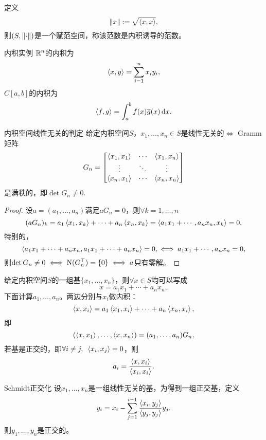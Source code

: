 定义
\begin{equation}
    \left\lVert x\right\rVert:=\sqrt{\left\langle x,x\right\rangle},
\end{equation}
则$(S,\left\lVert\cdot\right\rVert)$是一个赋范空间，称该范数是内积诱导的范数。

\begin{example}
    {内积实例}{}
    $\mathbb R^n$的内积为
    \[
        \left\langle x,y\right\rangle=\sum_{i=1}^nx_iy_i,
    \]
    $C[a,b]$的内积为 
    \[
        \left\langle f,g\right\rangle=\int_a^bf(x)\overline g(x)\mathop{}\!\mathrm{d} x.
    \]
\end{example}

\begin{theorem}
    {内积空间线性无关的判定}{}
    给定内积空间$S$，$x_1,\ldots,x_n\in S$是线性无关的$\iff$ Gramm矩阵
    \begin{equation}
        G_n=\begin{bmatrix}
            \left\langle x_1,x_1\right\rangle&\cdots&\left\langle x_1,x_n\right\rangle\\
            \vdots&\ddots&\vdots\\
            \left\langle x_n,x_1\right\rangle&\cdots&\left\langle x_n,x_n\right\rangle
        \end{bmatrix}
    \end{equation}
    是满秩的，即$\det G_n\neq 0.$
\end{theorem}

\begin{proof}
    设$a=(a_1,\ldots,a_n)$满足$aG_n=0$，则$\forall k=1,\ldots,n$
    \[
        (aG_n)_k=a_1\left\langle x_1,x_k\right\rangle+\cdots+a_n\left\langle x_n,x_k\right\rangle=\left\langle a_1x_1+\cdots,a_nx_n,x_k\right\rangle=0,
    \]
    特别的，
    \[
        \left\langle a_1x_1+\cdots+a_nx_n,a_1x_1+\cdots+a_nx_n\right\rangle=0,\iff a_1x_1+\cdots,a_nx_n=0,
    \]
    则$\det G_n\neq 0\iff \mathrm N(G_n^\top)=\{0\}\iff a$只有零解。
\end{proof}

\begin{example}
    {}{}
    给定内积空间$S$的一组基$\{x_1,\ldots,x_n\}$，则$\forall x\in S$均可以写成
    \[
        x=a_1x_1+\cdots+a_nx_n,
    \]
    下面计算$a_1,\ldots,a_n$。两边分别与$x_i$做内积：
    \[
        \left\langle x,x_i\right\rangle=a_1\left\langle x_1,x_i\right\rangle+\cdots+a_n\left\langle x_n,x_i\right\rangle,
    \]
    即
    \[
        (\left\langle x,x_1\right\rangle,\ldots,\left\langle x,x_n\right\rangle)=(a_1,\ldots,a_n)G_n,
    \]
    若基是正交的，即$\forall i\neq j,\enspace\left\langle x_i,x_j\right\rangle=0$，则 
    \[
        a_i=\frac{\left\langle x,x_i\right\rangle}{\left\langle x_i,x_i\right\rangle}.
    \]
\end{example}

\begin{theorem}
    {Schmidt正交化}{}
    设$x_1,\ldots,x_n$是一组线性无关的基，为得到一组正交基，定义
    \begin{equation}
        y_i=x_i-\sum_{j=1}^{i-1}\frac{\left\langle x_i,y_j\right\rangle}{\left\langle y_j,y_j\right\rangle}y_j.
    \end{equation}
    则$y_1,\ldots,y_n$是正交的。
\end{theorem}

